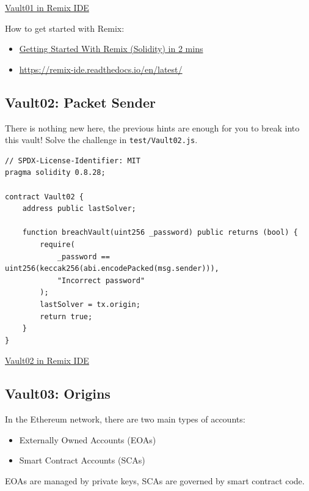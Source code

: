 \documentclass[12pt]{article}
\begin{document}
\medskip
\noindent
\href{https://remix.ethereum.org/?#activate=solidity&url=https://github.com/radovluk/unbreakable-vault/contracts/Vault01.sol&lang=en&optimize=false&runs=200&evmVersion=null&version=soljson-v0.8.28+commit.7893614a.js}{Vault01 in Remix IDE}

\medskip
\noindent
How to get started with Remix:
\begin{itemize}
  \item \href{https://www.youtube.com/watch?v=vH8T3In6ZkE&t=7s&ab_channel=EatTheBlocks}{Getting Started With Remix (Solidity) in 2 mins}
  \item \href{https://remix-ide.readthedocs.io/en/latest/}{https://remix-ide.readthedocs.io/en/latest/}
\end{itemize}

\subsection*{Vault02: Packet Sender}

There is nothing new here, the previous hints are enough for you to break into this vault! Solve the challenge in \texttt{test/Vault02.js}.

\begin{lstlisting}[language=Solidity]
// SPDX-License-Identifier: MIT
pragma solidity 0.8.28;
 
contract Vault02 {
    address public lastSolver;
 
    function breachVault(uint256 _password) public returns (bool) {
        require(
            _password == uint256(keccak256(abi.encodePacked(msg.sender))),
            "Incorrect password"
        );
        lastSolver = tx.origin;
        return true;
    }
}
\end{lstlisting}

\medskip
\noindent
\href{https://remix.ethereum.org/?#activate=solidity&url=https://github.com/radovluk/unbreakable-vault/contracts/Vault02.sol&lang=en&optimize=false&runs=200&evmVersion=null&version=soljson-v0.8.28+commit.7893614a.js}{Vault02 in Remix IDE}

\subsection*{Vault03: Origins}

In the Ethereum network, there are two main types of accounts:

\begin{itemize}
  \item Externally Owned Accounts (EOAs)
  \item Smart Contract Accounts (SCAs)
\end{itemize}
EOAs are managed by private keys, SCAs are governed by smart contract code.
\end{document}
